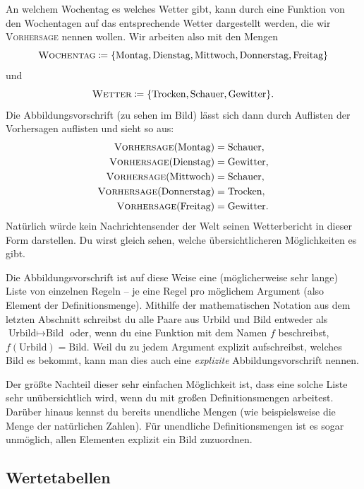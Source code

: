 \documentclass[../../main.tex]{subfiles}
\begin{document}
\begin{example}{}
    An welchem Wochentag es welches Wetter gibt, kann durch eine Funktion von den Wochentagen auf das entsprechende Wetter dargestellt werden, die wir \textsc{Vorhersage} nennen wollen. Wir arbeiten also mit den Mengen \[\textsc{Wochentag}\coloneqq\{\text{Montag},\text{Dienstag},\text{Mittwoch},\text{Donnerstag},\text{Freitag}\}\] und \[\textsc{Wetter}\coloneqq\{\text{Trocken},\text{Schauer},\text{Gewitter}\}.\]
    Die Abbildungsvorschrift (zu sehen im Bild) lässt sich dann durch Auflisten der Vorhersagen auflisten und sieht so aus:
    \begin{align*}
        \textsc{Vorhersage}(\text{Montag})&=\text{Schauer},\\ \textsc{Vorhersage}(\text{Dienstag})&=\text{Gewitter},\\ \textsc{Vorhersage}(\text{Mittwoch})&=\text{Schauer},\\ \textsc{Vorhersage}(\text{Donnerstag})&=\text{Trocken},\\ \textsc{Vorhersage}(\text{Freitag})&=\text{Gewitter}.
    \end{align*}
    Natürlich würde kein Nachrichtensender der Welt seinen Wetterbericht in dieser Form darstellen. Du wirst gleich sehen, welche übersichtlicheren Möglichkeiten es gibt.
\end{example}

Die Abbildungsvorschrift ist auf diese Weise eine (möglicherweise sehr lange) Liste von einzelnen Regeln -- je eine Regel pro möglichem Argument (also Element der Definitionsmenge).
Mithilfe der mathematischen Notation aus dem letzten Abschnitt schreibst du alle Paare aus Urbild und Bild entweder als \mbox{$\text{Urbild}\mapsto\text{Bild}$} oder, wenn du eine Funktion mit dem Namen $f$ beschreibst, \mbox{$f(\text{Urbild})=\text{Bild}$}. Weil du zu jedem Argument explizit aufschreibst, welches Bild es bekommt, kann man dies auch eine \emph{explizite} Abbildungsvorschrift nennen.

Der größte Nachteil dieser sehr einfachen Möglichkeit ist, dass eine solche Liste sehr unübersichtlich wird, wenn du mit großen Definitionsmengen arbeitest. Darüber hinaus kennst du bereits unendliche Mengen (wie beispielsweise die Menge \Natural{} der natürlichen Zahlen). Für unendliche Definitionsmengen ist es sogar unmöglich, allen Elementen explizit ein Bild zuzuordnen.

\subsection{Wertetabellen}
\label{sec:abbildungen_wertetabellen}
\end{document}
